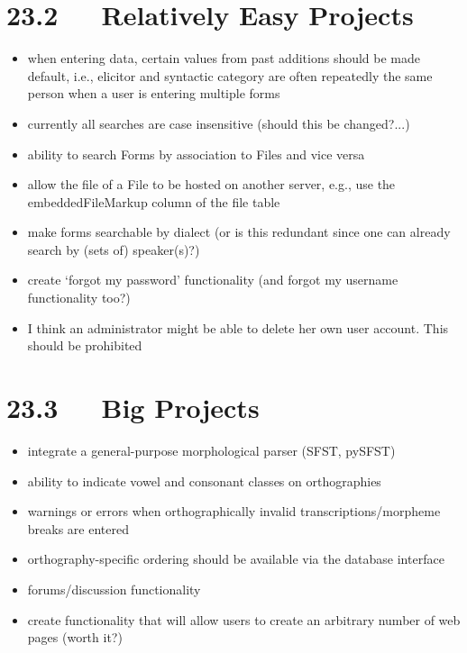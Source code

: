 \documentclass[letterpaper,10pt,english]{sphinxmanual}
\begin{document}
\section{23.2   Relatively Easy Projects}
\label{user_guide:relatively-easy-projects}\begin{itemize}
\item {} 
when entering data, certain values from past additions should be made default,
i.e., elicitor and syntactic category are often repeatedly the same person
when a user is entering multiple forms

\item {} 
currently all searches are case insensitive (should this be changed?...)

\item {} 
ability to search Forms by association to Files and vice versa

\item {} 
allow the file of a File to be hosted on another server, e.g., use the
embeddedFileMarkup column of the file table

\item {} 
make forms searchable by dialect (or is this redundant since one can already
search by (sets of) speaker(s)?)

\item {} 
create `forgot my password' functionality (and forgot my username
functionality too?)

\item {} 
I think an administrator might be able to delete her own user account.  This
should be prohibited

\end{itemize}


\section{23.3   Big Projects}
\label{user_guide:big-projects}\begin{itemize}
\item {} 
integrate a general-purpose morphological parser (SFST, pySFST)

\item {} 
ability to indicate vowel and consonant classes on orthographies

\item {} 
warnings or errors when orthographically invalid transcriptions/morpheme
breaks are entered

\item {} 
orthography-specific ordering should be available via the database interface

\item {} 
forums/discussion functionality

\item {} 
create functionality that will allow users to create an arbitrary number of
web pages (worth it?)

\end{itemize}
\end{document}

